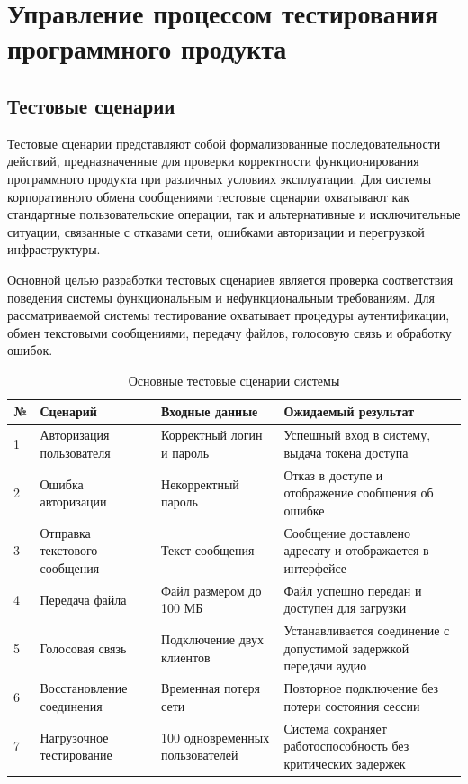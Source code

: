 \documentclass[14pt,a4paper]{extarticle}
\begin{document}
\section{Управление процессом тестирования программного продукта}

\subsection{Тестовые сценарии}

Тестовые сценарии представляют собой формализованные последовательности действий, предназначенные для проверки корректности функционирования программного продукта при различных условиях эксплуатации. Для системы корпоративного обмена сообщениями тестовые сценарии охватывают как стандартные пользовательские операции, так и альтернативные и исключительные ситуации, связанные с отказами сети, ошибками авторизации и перегрузкой инфраструктуры.

Основной целью разработки тестовых сценариев является проверка соответствия поведения системы функциональным и нефункциональным требованиям. Для рассматриваемой системы тестирование охватывает процедуры аутентификации, обмен текстовыми сообщениями, передачу файлов, голосовую связь и обработку ошибок.

\begin{table}[H]
\centering
\caption{Основные тестовые сценарии системы}
\begin{tabular}{|p{0.8cm}|p{4cm}|p{3.5cm}|p{4cm}|}
\hline
\textbf{№} &
\textbf{Сценарий} &
\textbf{Входные данные} &
\textbf{Ожидаемый результат} \\
\hline

1 &
Авторизация пользователя &
Корректный логин и пароль &
Успешный вход в систему, выдача токена доступа \\
\hline

2 &
Ошибка авторизации &
Некорректный пароль &
Отказ в доступе и отображение сообщения об ошибке \\
\hline

3 &
Отправка текстового сообщения &
Текст сообщения &
Сообщение доставлено адресату и отображается в интерфейсе \\
\hline

4 &
Передача файла &
Файл размером до 100 МБ &
Файл успешно передан и доступен для загрузки \\
\hline

5 &
Голосовая связь &
Подключение двух клиентов &
Устанавливается соединение с допустимой задержкой передачи аудио \\
\hline

6 &
Восстановление соединения &
Временная потеря сети &
Повторное подключение без потери состояния сессии \\
\hline

7 &
Нагрузочное тестирование &
100 одновременных пользователей &
Система сохраняет работоспособность без критических задержек \\
\hline

\end{tabular}
\end{table}
\end{document}
